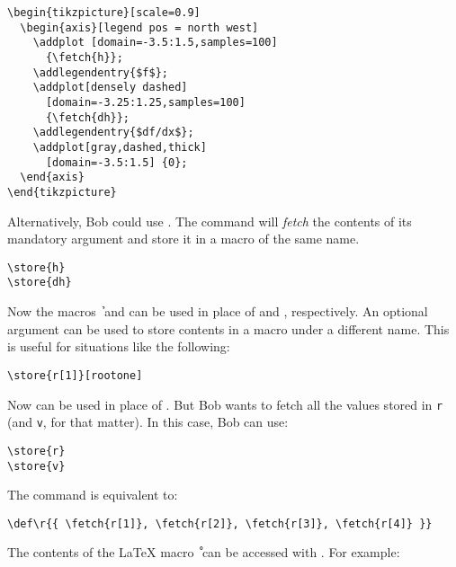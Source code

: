 \documentclass{article}
\begin{document}
\begin{codebox}\small
\begin{verbatim}
\begin{tikzpicture}[scale=0.9]
  \begin{axis}[legend pos = north west]
    \addplot [domain=-3.5:1.5,samples=100]
      {\fetch{h}};
    \addlegendentry{$f$};
    \addplot[densely dashed] 
      [domain=-3.25:1.25,samples=100]
      {\fetch{dh}};
    \addlegendentry{$df/dx$};
    \addplot[gray,dashed,thick]
      [domain=-3.5:1.5] {0};
  \end{axis}
\end{tikzpicture}
\end{verbatim}
\tcblower
{}
\end{codebox}
Alternatively, Bob could use \texttt{\store}. The \texttt{\store} command will \emph{fetch} the contents of its mandatory argument and store it in a macro of the same name. 
\begin{verbatim}
\store{h}
\store{dh}
\end{verbatim}
Now the macros \texttt{\h} and \texttt{\dh} can be used in place of \texttt{} and \texttt{}, respectively. An optional argument can be used to store contents in a macro under a different name. This is useful for situations like the following:
\begin{verbatim}
\store{r[1]}[rootone]
\end{verbatim}
Now \texttt{\rootone} can be used in place of \texttt{}. But Bob wants to fetch all the values stored in \texttt{r} (and \texttt{v}, for that matter). In this case, Bob can use:
\begin{verbatim}
\store{r}
\store{v}
\end{verbatim}
The command \texttt{} is equivalent to:
\begin{verbatim}
\def\r{{ \fetch{r[1]}, \fetch{r[2]}, \fetch{r[3]}, \fetch{r[4]} }}
\end{verbatim}
The contents of the \LaTeX{} macro \texttt{\r} can be accessed with \texttt{\pgfmathsetmacro}. For example:
\end{document}
